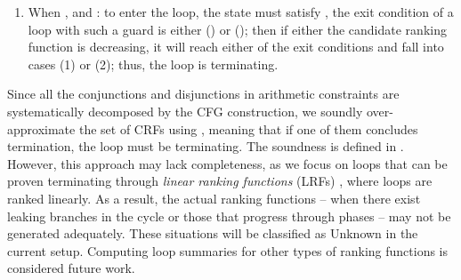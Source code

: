 \begin{theorem}
\begin{proofsketch}
{\begin{enumerate}
\item When , and : to enter the loop, the state must satisfy , 
the exit condition of a loop with such a guard \code{\pi} is either () or (); then if either the candidate ranking function is decreasing, it will reach either of the 
exit conditions and fall into cases (1) or (2); thus, the loop is terminating. 
\end{enumerate}}
\end{proofsketch}
\end{theorem}



Since all the conjunctions and disjunctions in arithmetic constraints are systematically decomposed by the CFG construction, we soundly over-approximate the set of CRFs using  , meaning that if one of them concludes termination, the loop must be terminating. The soundness is defined in . 
However, this approach may lack completeness, as we focus on loops that can be proven terminating through \emph{linear ranking functions} (LRFs) \cite{DBLP:conf/cav/Ben-AmramG17}, where loops are ranked linearly. 
As a result, the actual ranking functions -- when there exist leaking branches in the cycle or those that progress through phases -- may not be generated adequately. 
These situations will be classified as Unknown in the current setup. Computing loop summaries for other types of ranking functions is considered future work. %



